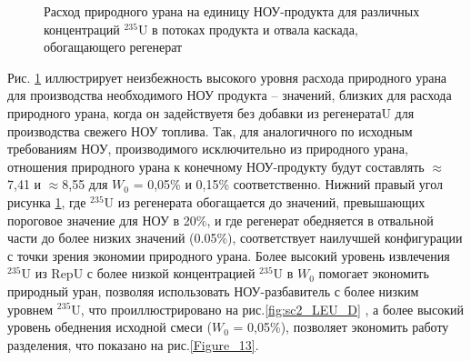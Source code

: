 \begin{figure}[ht]
  \caption{Расход природного урана на единицу НОУ-продукта  для различных концентраций $^{235}$U в потоках продукта и отвала каскада, обогащающего регенерат}\label{fig:sc2_2}
\end{figure}

Рис. \ref{fig:sc2_2} иллюстрирует неизбежность высокого уровня расхода природного урана для производства необходимого НОУ продукта  -- значений, близких для расхода природного урана, когда он задействуетя без добавки из регенератаU для производства свежего НОУ топлива. Так, для аналогичного по исходным требованиям НОУ, производимого исключительно из природного урана, отношения природного урана к конечному НОУ-продукту будут составлять $\approx$7,41 и $\approx$8,55 для $W_0$ = 0,05\% и 0,15\% соответственно. Нижний правый угол рисунка \ref{fig:sc2_2}, где $^{235}$U из регенерата обогащается до значений, превышающих пороговое значение для НОУ в 20\%, и где регенерат обедняется в отвальной части до более низких значений (0.05\%), соответствует наилучшей конфигурации с точки зрения экономии природного урана. Более высокий уровень извлечения $^{235}$U из RepU с более низкой концентрацией $^{235}$U в $W_0$ помогает экономить природный уран, позволяя использовать НОУ-разбавитель с более низким уровнем $^{235}$U, что проиллюстрировано на рис.\ref{fig:sc2_LEU_D} , а более высокий уровень обеднения исходной смеси ($W_0$ = 0,05\%), позволяет экономить  работу разделения, что показано на рис.\ref{Figure_13}.

